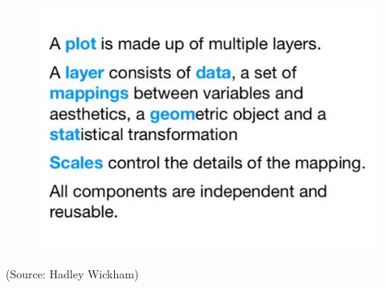 \documentclass{beamer}
\begin{document}
\begin{frame}[fragile]
	\begin{figure}
		\centering
		\includegraphics[width=1.1\linewidth]{ggplot2-info}
	\end{figure}
	(Source: Hadley Wickham)
\end{frame}
\end{document}

